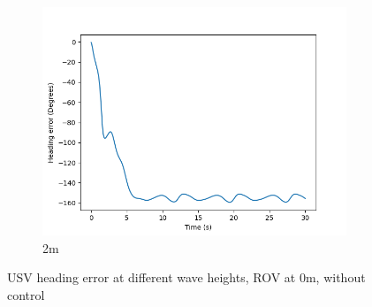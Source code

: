 \documentclass[class=article, crop=false]{standalone}
\begin{document}
\begin{figure}
\begin{subfigure}[b]{0.48\textwidth}
        \centering
        \includegraphics{scenario1/rov-0m/2.0m/usv_heading_error_uncontrolled}
        \caption{2m}
        \label{}
    \end{subfigure}

    \caption{USV heading error at different wave heights, ROV at 0m, without control}
\end{figure}
\end{document}
